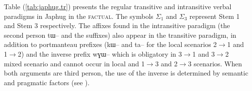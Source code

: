 \documentclass[oldfontcommands,oneside,a4paper,11pt]{article}
\newcommand{\ipa}[1]{{\phon#1}} %
\newcommand{\siga}{$\Sigma_1$}
\newcommand{\sigc}{$\Sigma_3$}
\newcommand{\refb}[1]{(\ref{#1})}
\begin{document}
Table \refb{tab:japhug.tr} presents the regular transitive and intransitive verbal paradigms in Japhug in the \textsc{factual}. The symbols \siga{} and \sigc{} represent Stem 1 and Stem 3 respectively. The affixes found in the intransitive paradigm (the second person \ipa{tɯ--} and the suffixes) also appear in the transitive paradigm, in addition to portmanteau prefixes (\ipa{kɯ--} and \ipa{ta--} for the local scenarios 2$\rightarrow$1 and 1$\rightarrow$2) and the inverse prefix \ipa{wɣɯ--} which is obligatory in 3$\rightarrow$1 and 3$\rightarrow$2 mixed scenario and cannot occur in local and 1$\rightarrow$3 and 2$\rightarrow$3 scenarios. When both arguments are third person, the use of the inverse is determined by semantic and pragmatic factors (see \citealt{jacques10inverse}).
\begin{landscape}



\end{landscape}
\end{document}
